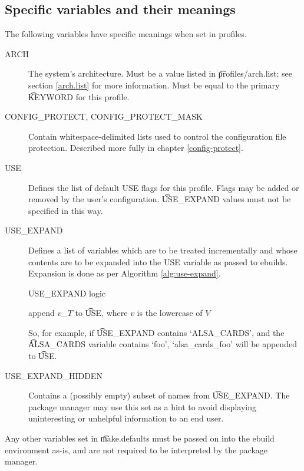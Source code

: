 \subsection{Specific variables and their meanings}
The following variables have specific meanings when set in profiles.
\begin{description}
\item[ARCH] The system's architecture. Must be a value listed in \t{profiles/arch.list}; see section
    \ref{arch.list} for more information. Must be equal to the primary \t{KEYWORD} for this profile.
\item[CONFIG\_PROTECT, CONFIG\_PROTECT\_MASK] Contain whitespace-delimited lists used to control the
    configuration file protection. Described more fully in chapter \ref{config-protect}.
\item[USE] Defines the list of default USE flags for this profile. Flags may be added or removed by
    the user's configuration. \t{USE\_EXPAND} values must not be specified in this way.
\item[USE\_EXPAND] \label{use-expand} Defines a list of variables which are to be treated
    incrementally and whose contents are to be expanded into the USE variable as passed to ebuilds.
    Expansion is done as per Algorithm \ref{alg:use-expand}.
    \begin{algorithm}
    \caption{USE\_EXPAND logic} \label{alg:use-expand}
    \begin{algorithmic}
                \STATE append $v$\_$T$ to \t{USE}, where $v$ is the lowercase of $V$
            \ENDFOR
        \ENDFOR
    \end{algorithmic}
    \end{algorithm}
    So, for example, if \t{USE\_EXPAND} contains `ALSA\_CARDS', and the \t{ALSA\_CARDS} variable
    contains `foo', `alsa\_cards\_foo' will be appended to \t{USE}.
\item[USE\_EXPAND\_HIDDEN] Contains a (possibly empty) subset of names from \t{USE\_EXPAND}. The
    package manager may use this set as a hint to avoid displaying uninteresting or unhelpful
    information to an end user.
\end{description}

Any other variables set in \t{make.defaults} must be passed on into the ebuild environment as-is,
and are not required to be interpreted by the package manager.

